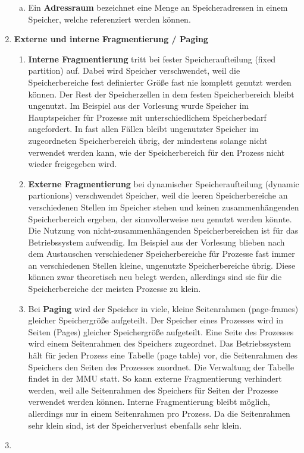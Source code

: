 \documentclass[numbers=noendperiod]{scrartcl}
\begin{document}
\begin{enumerate}[1.]
\begin{enumerate}[a)]
		\item Ein \textbf{Adressraum} bezeichnet eine Menge an Speicheradressen in einem Speicher, welche referenziert werden können.
	\end{enumerate}
	
	\item \textbf{Externe und interne Fragmentierung / Paging}
		\begin{enumerate}
			\item \textbf{Interne Fragmentierung} tritt bei fester Speicheraufteilung (fixed partition) auf. Dabei wird Speicher verschwendet, weil die Speicherbereiche fest definierter Größe fast nie komplett genutzt werden können. Der Rest der Speicherzellen in dem festen Speicherbereich bleibt ungenutzt. Im Beispiel aus der Vorlesung wurde Speicher im Hauptspeicher für Prozesse mit unterschiedlichem Speicherbedarf angefordert. In fast allen Fällen bleibt ungenutzter Speicher im zugeordneten Speicherbereich übrig, der mindestens solange nicht verwendet werden kann, wie der Speicherbereich für den Prozess nicht wieder freigegeben wird.
			 
			\item \textbf{Externe Fragmentierung} bei dynamischer Speicheraufteilung (dynamic partionions) verschwendet Speicher, weil die leeren Speicherbereiche an verschiedenen Stellen im Speicher stehen und keinen zusammenhängenden Speicherbereich ergeben, der sinnvollerweise neu genutzt werden könnte. Die Nutzung von nicht-zusammenhängenden Speicherbereichen ist für das Betriebssystem aufwendig. Im Beispiel aus der Vorlesung blieben nach dem Austauschen verschiedener Speicherbereiche für Prozesse fast immer an verschiedenen Stellen kleine, ungenutzte Speicherbereiche übrig. Diese können zwar theoretisch neu belegt werden, allerdings sind sie für die Speicherbereiche der meisten Prozesse zu klein.
			\item Bei \textbf{Paging} wird der Speicher in viele, kleine Seitenrahmen (page-frames) gleicher Speichergröße aufgeteilt. Der Speicher eines Prozesses wird in Seiten (Pages) gleicher Speichergröße aufgeteilt. Eine Seite des Prozesses wird einem Seitenrahmen des Speichers zugeordnet. Das Betriebssystem hält für jeden Prozess eine Tabelle (page table) vor, die Seitenrahmen des Speichers den Seiten des Prozesses zuordnet. Die Verwaltung der Tabelle findet in der MMU statt. So kann externe Fragmentierung verhindert werden, weil alle Seitenrahmen des Speichers für Seiten der Prozesse verwendet werden können. Interne Fragmentierung bleibt möglich, allerdings nur in einem Seitenrahmen pro Prozess. Da die Seitenrahmen sehr klein sind, ist der Speicherverlust ebenfalls sehr klein.
				
		\end{enumerate}
	
	\item
	
\end{enumerate}
\end{document}

